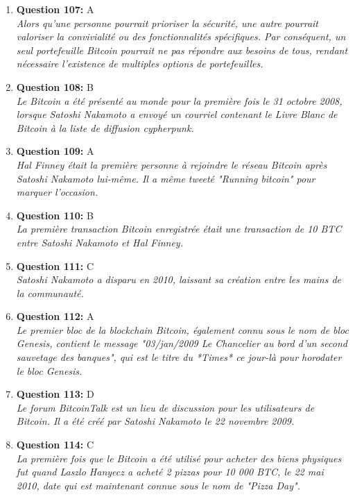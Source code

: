 \documentclass[12pt,a4paper]{article}
\begin{document}
\begin{enumerate}
\item \textbf{Question 107:} A
\\ \textit{Alors qu'une personne pourrait prioriser la sécurité, une autre pourrait valoriser la convivialité ou des fonctionnalités spécifiques. Par conséquent, un seul portefeuille Bitcoin pourrait ne pas répondre aux besoins de tous, rendant nécessaire l'existence de multiples options de portefeuilles.}

\item \textbf{Question 108:} B
\\ \textit{Le Bitcoin a été présenté au monde pour la première fois le 31 octobre 2008, lorsque Satoshi Nakamoto a envoyé un courriel contenant le Livre Blanc de Bitcoin à la liste de diffusion cypherpunk.}

\item \textbf{Question 109:} A
\\ \textit{Hal Finney était la première personne à rejoindre le réseau Bitcoin après Satoshi Nakamoto lui-même. Il a même tweeté "Running bitcoin" pour marquer l'occasion.}

\item \textbf{Question 110:} B
\\ \textit{La première transaction Bitcoin enregistrée était une transaction de 10 BTC entre Satoshi Nakamoto et Hal Finney.}

\item \textbf{Question 111:} C
\\ \textit{Satoshi Nakamoto a disparu en 2010, laissant sa création entre les mains de la communauté.}

\item \textbf{Question 112:} A
\\ \textit{Le premier bloc de la blockchain Bitcoin, également connu sous le nom de bloc Genesis, contient le message "03/jan/2009 Le Chancelier au bord d'un second sauvetage des banques", qui est le titre du *Times* ce jour-là pour horodater le bloc Genesis.}

\item \textbf{Question 113:} D
\\ \textit{Le forum BitcoinTalk est un lieu de discussion pour les utilisateurs de Bitcoin. Il a été créé par Satoshi Nakamoto le 22 novembre 2009.}

\item \textbf{Question 114:} C
\\ \textit{La première fois que le Bitcoin a été utilisé pour acheter des biens physiques fut quand Laszlo Hanyecz a acheté 2 pizzas pour 10 000 BTC, le 22 mai 2010, date qui est maintenant connue sous le nom de "Pizza Day".}


\end{enumerate}
\end{document}

